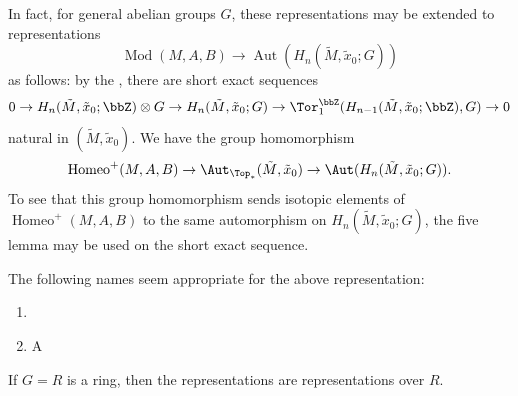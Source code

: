 \begin{definition}
    In fact, for general abelian groups $G$, these representations may be extended to representations
    $$\operatorname{Mod}(M,A,B) \to \operatorname{Aut}(H_n(\tilde{M}, \tilde{x}_0; G))$$
    as follows: by the , there are short exact sequences
    $$0 \to H_n(\tilde{M}, \tilde{x}_0; \bbZ) \otimes G \to H_n(\tilde{M}, \tilde{x}_0; G) \to \Tor_1^{\bbZ}(H_{n-1}(\tilde{M}, \tilde{x}_0;\bbZ), G) \to 0$$
    natural in $(\tilde{M}, \tilde{x}_0)$. We have the group homomorphism
    $$\operatorname{Homeo}^+(M,A,B) \to \Aut_{\Top_*}(\tilde{M},\tilde{x}_0) \to \Aut(H_n(\tilde{M}, \tilde{x}_0; G)).$$
    To see that this group homomorphism sends isotopic elements of $\operatorname{Homeo}^+(M,A,B)$ to the same automorphism on $H_n(\tilde{M}, \tilde{x}_0; G)$, the five lemma may be used on the short exact sequence.

    The following names seem appropriate for the above representation:
    \begin{enumerate}
        \item {}
        \item A 
    \end{enumerate}
    If $G = R$ is a ring, then the representations are representations over $R$.
\end{definition}